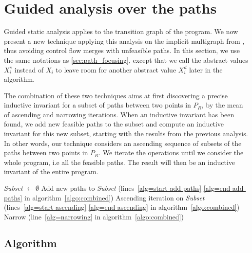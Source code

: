 \documentclass[preprint]{sigplanconf}
\newcommand{\MM}[1]{{\color{blue} TODO(MM): #1}}
\begin{document}
\section{Guided analysis over the paths}
\label{sec:guided_multigraph}

Guided static analysis \cite{DBLP:conf/sas/GopanR07} applies to the transition
graph of the program. We now present a new technique applying this analysis on the implicit
multigraph from \cite{Monniaux_Gonnord_SAS11}, thus avoiding control flow merges with
unfeasible paths.
In this section, we use the same notations as \ref{sec:path_focusing}, except
that we call the abstract values $X_i^s$ instead of $X_i$ to leave room for
another abstract value $X_i^d$ later in the algorithm.


The combination of these two techniques aims at first discovering a precise
inductive invariant for a subset of paths between two points in $P_R$, 
by the mean of ascending and narrowing iterations. When an
inductive invariant has been found, we add new feasible paths to the subset and
compute an inductive invariant for this new subset, starting with the results
from the previous analysis.
In other words, our technique considers an ascending sequence of
subsets of the paths between two points in $P_R$.
We iterate the operations until we consider the whole program, i.e all the
feasible paths. The result will then be an inductive invariant of the entire program.

\begin{algorithm}
  \begin{algorithmic}
    \STATE \textit{Subset} $\gets \emptyset$
    \STATE Add new paths to \textit{Subset} (lines~\ref{alg=start-add-paths}-\ref{alg=end-add-paths} in algorithm~\ref{algo:combined})
    \STATE Ascending iteration on \textit{Subset} (lines~\ref{alg=start-ascending}-\ref{alg=end-ascending} in algorithm~\ref{algo:combined})
    \STATE Narrow (line~\ref{alg=narrowing} in algorithm~\ref{algo:combined})
    \ENDWHILE
  \end{algorithmic}
\end{algorithm}


%
%

\subsection{Algorithm}
\end{document}

